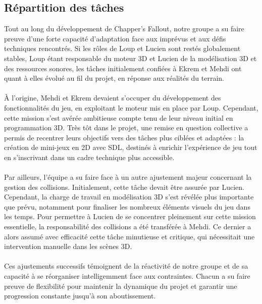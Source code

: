     \subsection{Répartition des tâches}
        Tout au long du développement de Chapper's Fallout, notre groupe a su faire preuve d’une forte capacité d’adaptation face aux imprévus et aux défis techniques rencontrés. 
        Si les rôles de Loup et Lucien sont restés globalement stables, Loup étant responsable du moteur 3D et Lucien de la modélisation 3D et des ressources sonores, les 
        tâches initialement confiées à Ekrem et Mehdi ont quant à elles évolué au fil du projet, en réponse aux réalités du terrain.
        \\ \\
        À l’origine, Mehdi et Ekrem devaient s’occuper du développement des \\fonctionnalités du jeu, en exploitant le moteur mis en place par Loup. Cependant, cette mission 
        s’est avérée ambitieuse compte tenu de leur niveau initial en programmation 3D. Très tôt dans le projet, une remise en question collective a permis de recentrer 
        leurs objectifs vers des tâches plus ciblées et adaptées : la création de mini-jeux en 2D avec SDL, destinés à enrichir l’expérience de jeu tout en s’inscrivant 
        dans un cadre technique plus accessible.
        \\ \\
        Par ailleurs, l’équipe a su faire face à un autre ajustement majeur concernant la gestion des collisions. Initialement, cette tâche devait être assurée par Lucien. 
        Cependant, la charge de travail en modélisation 3D s’est révélée plus importante que prévu, notamment pour finaliser les nombreux éléments visuels du jeu dans les 
        temps. Pour permettre à Lucien de se concentrer pleinement sur cette mission essentielle, la responsabilité des collisions a été transférée à Mehdi. Ce dernier a 
        alors assumé avec efficacité cette tâche minutieuse et critique, qui nécessitait une intervention manuelle dans les scènes 3D. 
        \\ \\
        Ces ajustements successifs témoignent de la réactivité de notre groupe et de sa capacité à se réorganiser intelligemment face aux contraintes. Chacun a su faire 
        preuve de flexibilité pour maintenir la dynamique du projet et garantir une progression constante jusqu’à son aboutissement. 